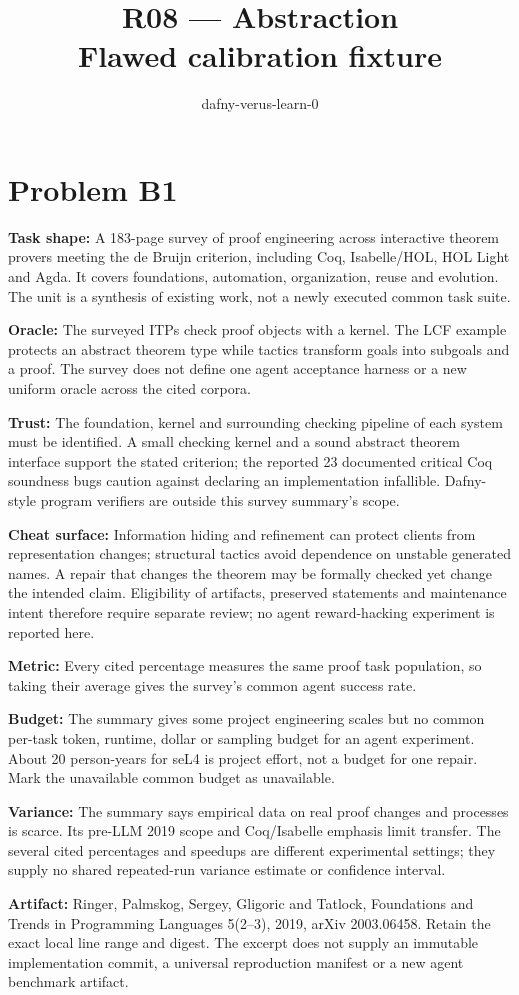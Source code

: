 \documentclass[11pt]{article}
\title{R08 --- Abstraction \\ \large Flawed calibration fixture}
\author{dafny-verus-learn-0}
\date{}
\begin{document}
\maketitle
\section*{Problem B1}\label{ans:B1}
\begin{answer}
\textbf{Task shape:} A 183-page survey of proof engineering across interactive theorem provers meeting the de Bruijn criterion, including Coq, Isabelle/HOL, HOL Light and Agda. It covers foundations, automation, organization, reuse and evolution. The unit is a synthesis of existing work, not a newly executed common task suite.

\textbf{Oracle:} The surveyed ITPs check proof objects with a kernel. The LCF example protects an abstract theorem type while tactics transform goals into subgoals and a proof. The survey does not define one agent acceptance harness or a new uniform oracle across the cited corpora.

\textbf{Trust:} The foundation, kernel and surrounding checking pipeline of each system must be identified. A small checking kernel and a sound abstract theorem interface support the stated criterion; the reported 23 documented critical Coq soundness bugs caution against declaring an implementation infallible. Dafny-style program verifiers are outside this survey summary's scope.

\textbf{Cheat surface:} Information hiding and refinement can protect clients from representation changes; structural tactics avoid dependence on unstable generated names. A repair that changes the theorem may be formally checked yet change the intended claim. Eligibility of artifacts, preserved statements and maintenance intent therefore require separate review; no agent reward-hacking experiment is reported here.

\textbf{Metric:} Every cited percentage measures the same proof task population, so taking their average gives the survey's common agent success rate.

\textbf{Budget:} The summary gives some project engineering scales but no common per-task token, runtime, dollar or sampling budget for an agent experiment. About 20 person-years for seL4 is project effort, not a budget for one repair. Mark the unavailable common budget as unavailable.

\textbf{Variance:} The summary says empirical data on real proof changes and processes is scarce. Its pre-LLM 2019 scope and Coq/Isabelle emphasis limit transfer. The several cited percentages and speedups are different experimental settings; they supply no shared repeated-run variance estimate or confidence interval.

\textbf{Artifact:} Ringer, Palmskog, Sergey, Gligoric and Tatlock, Foundations and Trends in Programming Languages 5(2--3), 2019, arXiv 2003.06458. Retain the exact local line range and digest. The excerpt does not supply an immutable implementation commit, a universal reproduction manifest or a new agent benchmark artifact.
\end{answer}
\end{document}
